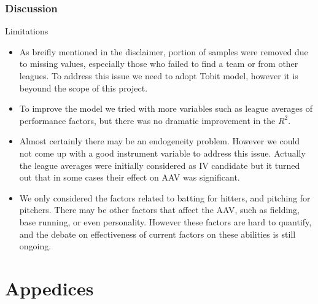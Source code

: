 \documentclass[9pt]{beamer}
\begin{document}
\begin{frame}
    \frametitle{Discussion}
    \begin{block}{Limitations}
        \begin{itemize}
            \item As breifly mentioned in the disclaimer, portion of samples were removed due to missing values, especially those who failed to find a team or from other leagues. To address this issue we need to adopt Tobit model, however it is beyound the scope of this project.
            \item To improve the model we tried with more variables such as league averages of performance factors, but there was no dramatic improvement in the $R^2$.
            \item Almost certainly there may be an endogeneity problem. However we could not come up with a good instrument variable to address this issue. Actually the league averages were initially considered as IV candidate but it turned out that in some cases their effect on AAV was significant.
            \item We only considered the factors related to batting for hitters, and pitching for pitchers. There may be other factors that affect the AAV, such as fielding, base running, or even personality. However these factors are hard to quantify, and the debate on effectiveness of current factors on these abilities is still ongoing.
        \end{itemize}
        
    \end{block}
\end{frame}


\section{Appedices}
\end{document}
